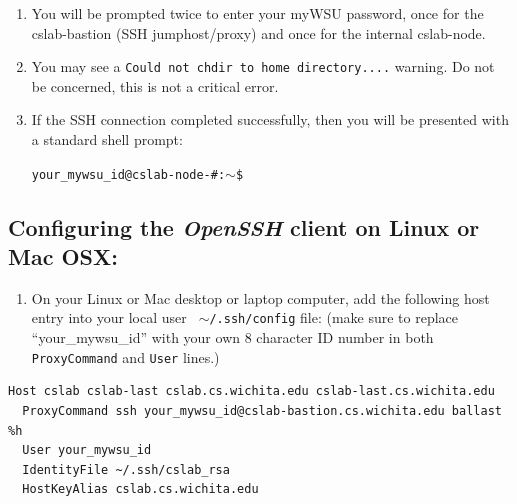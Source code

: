 \documentclass[12pt]{article}
\begin{document}
\begin{enumerate}
\item You will be prompted twice to enter your myWSU password, once for the cslab-bastion (SSH jumphost/proxy) and once for the internal cslab-node.
\item You may see a \texttt{Could not chdir to home directory....} warning. Do not be concerned, this is not a critical error.
\item If the SSH connection completed successfully, then you will be presented with a standard shell prompt:

\texttt{your\_mywsu\_id@cslab-node-\#:$\sim$\$}
\end{enumerate}

\subsection*{Configuring the \textit{OpenSSH} client on Linux or Mac OSX:}
\begin{enumerate}
  \item On your Linux or Mac desktop or laptop computer, add the following host entry into your local user \texttt{ $\sim$/.ssh/config} file: \break
  (make sure to replace ``your\_mywsu\_id'' with your own 8 character ID number in both \texttt{ProxyCommand} and \texttt{User} lines.)
\end{enumerate}

\begin{verbatim}
Host cslab cslab-last cslab.cs.wichita.edu cslab-last.cs.wichita.edu
  ProxyCommand ssh your_mywsu_id@cslab-bastion.cs.wichita.edu ballast %h
  User your_mywsu_id
  IdentityFile ~/.ssh/cslab_rsa
  HostKeyAlias cslab.cs.wichita.edu
\end{verbatim}
\end{document}
